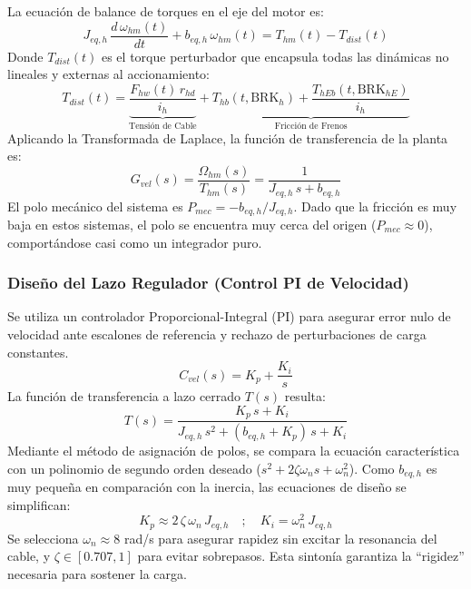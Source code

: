 \documentclass[11pt]{article}                                    %
\begin{document}
La ecuación de balance de torques en el eje del motor es:
\begin{equation}
    J_{eq,h} \, \frac{d \, \omega_{hm}(t)}{dt} + b_{eq,h} \, \omega_{hm}(t) = T_{hm}(t) - T_{dist}(t)
\end{equation}
Donde $T_{dist}(t)$ es el torque perturbador que encapsula todas las dinámicas no lineales y externas al accionamiento:
\begin{equation}
    T_{dist}(t) = \underbrace{\frac{F_{hw}(t) \, r_{hd}}{i_h}}_{\text{Tensión de Cable}} + \underbrace{T_{hb}(t,\text{BRK}_h) + \frac{T_{hEb}(t,\text{BRK}_{hE})}{i_h}}_{\text{Fricción de Frenos}}
\end{equation}
Aplicando la Transformada de Laplace, la función de transferencia de la planta es:
\begin{equation} \label{eq:G_vel}
    G_{vel}(s) = \frac{\Omega_{hm}(s)}{T_{hm}(s)} = \frac{1}{J_{eq,h} \, s + b_{eq,h}}
\end{equation}
El polo mecánico del sistema es $P_{mec} = -b_{eq,h}/J_{eq,h}$. Dado que la fricción es muy baja en estos sistemas, el polo se encuentra muy cerca del origen ($P_{mec} \approx 0$), comportándose casi como un integrador puro.

\subsubsection{Diseño del Lazo Regulador (Control PI de Velocidad)}
Se utiliza un controlador Proporcional-Integral (PI) para asegurar error nulo de velocidad ante escalones de referencia y rechazo de perturbaciones de carga constantes.
\begin{equation}
    C_{vel}(s) = K_p + \frac{K_i}{s}
\end{equation}
La función de transferencia a lazo cerrado $T(s)$ resulta:
\begin{equation}
    T(s) = \frac{K_p \, s + K_i}{J_{eq,h} \, s^2 + (b_{eq,h} + K_p) \, s + K_i}
\end{equation}
Mediante el método de asignación de polos, se compara la ecuación característica con un polinomio de segundo orden deseado ($s^2 + 2\zeta\omega_ns + \omega_n^2$). Como $b_{eq,h}$ es muy pequeña en comparación con la inercia, las ecuaciones de diseño se simplifican:
\begin{equation} \label{eq:gains_hoist}
    K_p \approx 2 \, \zeta \, \omega_n \, J_{eq,h} \quad ; \quad K_i = \omega_n^2 \, J_{eq,h}
\end{equation}
Se selecciona $\omega_n \approx 8$ rad/s para asegurar rapidez sin excitar la resonancia del cable, y $\zeta \in [0.707, 1]$ para evitar sobrepasos. Esta sintonía garantiza la ``rigidez'' necesaria para sostener la carga.
\end{document}

